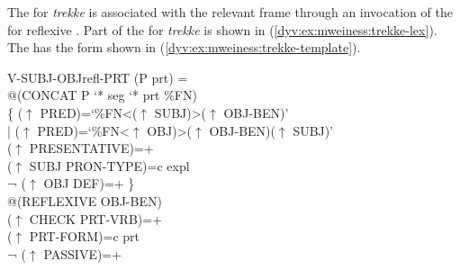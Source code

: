 \documentclass[output=paper]{langsci/langscibook}
\begin{document}
The  for \textit{trekke} is associated with the relevant frame through an invocation of the  for reflexive .
Part of the  for \textit{trekke} is shown in  (\ref{dyv:ex:mweiness:trekke-lex}).
The  has the form shown in  (\ref{dyv:ex:mweiness:trekke-template}).


\ea\label{dyv:ex:mweiness:trekke-template}
{\small 
V-SUBJ-OBJrefl-PRT (P prt) =\\%
\hspace{1.5em} @(CONCAT P `* seg `* prt  \%FN)\\%
\hspace{1.5em}  \{ \enspace ($\uparrow$  PRED)=`\%FN<($\uparrow$ SUBJ)>($\uparrow$ OBJ-BEN)'\\%
\hspace{1.5em} | \enspace ($\uparrow$  PRED)=`\%FN<$\uparrow$ OBJ)>($\uparrow$  OBJ-BEN)($\uparrow$ SUBJ)'\\%
\hspace{1.5em} \quad ($\uparrow$ PRESENTATIVE)=+\\%
\hspace{1.5em} \quad ($\uparrow$ SUBJ PRON-TYPE)=c expl\\%
\hspace{1.5em} \quad ¬ ($\uparrow$ OBJ DEF)=+ \enspace \}\\%
\hspace{1.5em} @(REFLEXIVE OBJ-BEN)\\%
\hspace{1.5em} ($\uparrow$ CHECK PRT-VRB)=+\\%
\hspace{1.5em} ($\uparrow$ PRT-FORM)=c prt\\%
\hspace{1.5em} ¬ ($\uparrow$ PASSIVE)=+
}
\z
\end{document}
